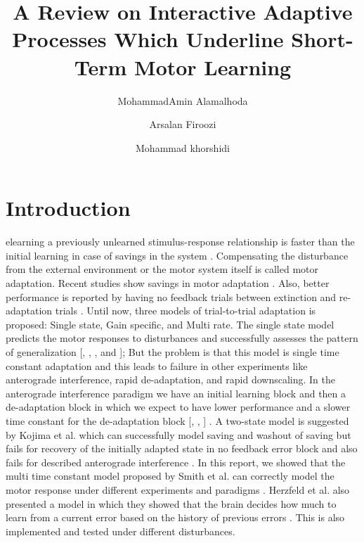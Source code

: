 \documentclass[9pt,twocolumn]{paper-template}
\title{A Review on Interactive Adaptive Processes Which Underline Short-Term Motor Learning}
\author[a]{MohammadAmin Alamalhoda}
\author[a]{Arsalan Firoozi}
\author[a]{Mohammad khorshidi}
\affil[a]{Student, EE Department, Sharif University of Technology}
\begin{document}
\maketitle
\thispagestyle{firststyle}

\section*{Introduction}
elearning a previously unlearned stimulus-response relationship is faster than the initial learning in case of savings in the system \cite{main_paper}. Compensating the disturbance from the external environment or the motor system itself is called motor adaptation. Recent studies show savings in motor adaptation  \cite{Kojima}. Also, better performance is reported by having no feedback trials between extinction and re-adaptation trials \cite{Kojima}. 
Until now, three models of trial-to-trial adaptation is proposed: Single state, Gain specific, and Multi rate. The single state model predicts the motor responses to disturbances and successfully assesses the pattern of generalization [\cite{Scheidt}, \cite{Baddeley}, \cite{Thoroughman}, and \cite{Donchin}]; But the problem is that this model is single time constant adaptation and this leads to failure in other experiments like anterograde interference, rapid de-adaptation, and rapid downscaling. In the anterograde interference paradigm we have an initial learning block and then a de-adaptation block in which we expect to have lower performance and a slower time constant for the de-adaptation block [\cite{Bizzi}, \cite{shadmehr_jn}, \cite{Wolpert}] . A two-state model is suggested by Kojima et al. which can successfully model saving and washout of saving but fails for recovery of the initially adapted state in no feedback error block and also fails for described anterograde interference \cite{Kojima}.
In this report, we showed that the multi time constant model proposed by Smith et al. can correctly model the motor response under different experiments and paradigms \cite{main_paper}. Herzfeld et al. also presented a model in which they showed that the brain decides how much to learn from a current error based on the history of previous errors \cite{mem_error}. This is also implemented and tested under different disturbances.\\
\end{document}
